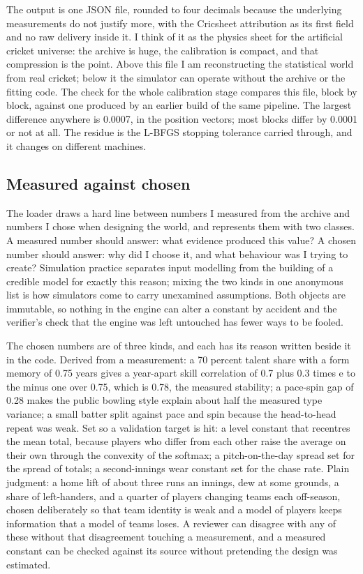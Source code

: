\documentclass[11pt,letterpaper]{article}
\begin{document}
The output is one JSON file, rounded to four decimals because the underlying measurements do not justify more, with the Cricsheet attribution as its first field and no raw delivery inside it. I think of it as the physics sheet for the artificial cricket universe: the archive is huge, the calibration is compact, and that compression is the point. Above this file I am reconstructing the statistical world from real cricket; below it the simulator can operate without the archive or the fitting code. The check for the whole calibration stage compares this file, block by block, against one produced by an earlier build of the same pipeline. The largest difference anywhere is 0.0007, in the position vectors; most blocks differ by 0.0001 or not at all. The residue is the L-BFGS stopping tolerance carried through, and it changes on different machines.


\subsection{Measured against chosen}

The loader draws a hard line between numbers I measured from the archive and numbers I chose when designing the world, and represents them with two classes. A measured number should answer: what evidence produced this value? A chosen number should answer: why did I choose it, and what behaviour was I trying to create? Simulation practice separates input modelling from the building of a credible model for exactly this reason; mixing the two kinds in one anonymous list is how simulators come to carry unexamined assumptions. Both objects are immutable, so nothing in the engine can alter a constant by accident and the verifier's check that the engine was left untouched has fewer ways to be fooled.


The chosen numbers are of three kinds, and each has its reason written beside it in the code. Derived from a measurement: a 70 percent talent share with a form memory of 0.75 years gives a year-apart skill correlation of 0.7 plus 0.3 times e to the minus one over 0.75, which is 0.78, the measured stability; a pace-spin gap of 0.28 makes the public bowling style explain about half the measured type variance; a small batter split against pace and spin because the head-to-head repeat was weak. Set so a validation target is hit: a level constant that recentres the mean total, because players who differ from each other raise the average on their own through the convexity of the softmax; a pitch-on-the-day spread set for the spread of totals; a second-innings wear constant set for the chase rate. Plain judgment: a home lift of about three runs an innings, dew at some grounds, a share of left-handers, and a quarter of players changing teams each off-season, chosen deliberately so that team identity is weak and a model of players keeps information that a model of teams loses. A reviewer can disagree with any of these without that disagreement touching a measurement, and a measured constant can be checked against its source without pretending the design was estimated.
\end{document}
